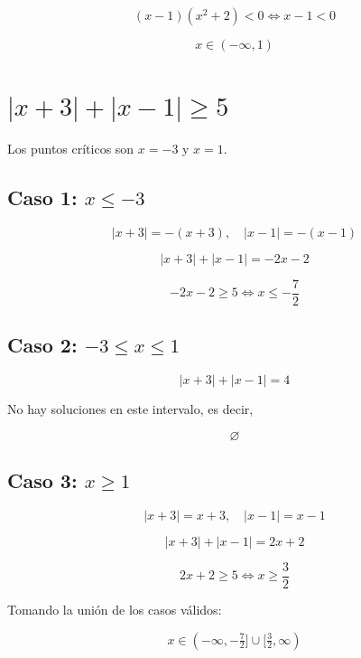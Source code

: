\documentclass{article}
\begin{document}
	$$
	(x-1)(x^2+2)<0 \iff x-1<0
	$$
	
	$$
	\boxed{x\in(-\infty , 1)}
	$$
	
	
	\section{$|x+3|+|x-1|\ge 5$}
	
	Los puntos críticos son $x=-3$ y $x=1$.
	
	\subsection*{Caso 1: $x\le -3$}
	
	$$
	|x+3|=-(x+3),\quad |x-1|=-(x-1)
	$$
	
	$$
	|x+3|+|x-1|=-2x-2
	$$
	
	$$
	-2x-2\ge5 \iff x\le -\frac{7}{2}
	$$
	
	\subsection*{Caso 2: $-3\le x\le 1$}
	
	$$
	|x+3|+|x-1|=4
	$$
	
	No hay soluciones en este intervalo, es decir,
	
	$$
	\varnothing
	$$
	
	\subsection*{Caso 3: $x\ge 1$}
	
	$$
	|x+3|=x+3,\quad |x-1|=x-1
	$$
	
	$$
	|x+3|+|x-1|=2x+2
	$$
	
	$$
	2x+2\ge5 \iff x\ge \frac{3}{2}
	$$
	
	
	
	Tomando la unión de los casos válidos:
	
	$$
	\boxed{x\in(-\infty,-\tfrac{7}{2}] \cup [\tfrac{3}{2},\infty)}
	$$
	
	
	
\end{document}
